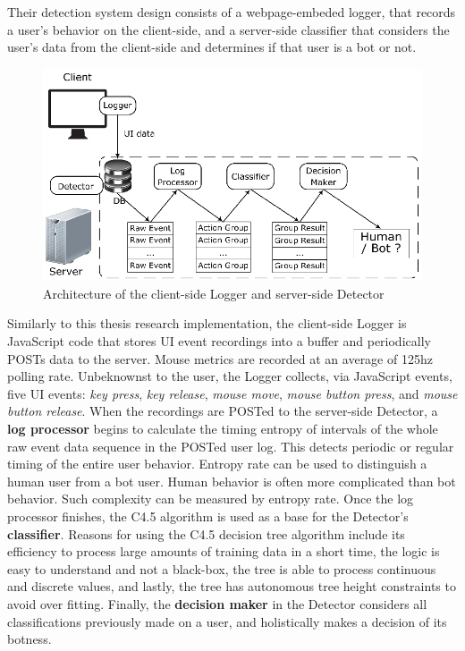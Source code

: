Their detection system design consists of a webpage-embeded logger, that records a user's behavior on the client-side, and a server-side classifier that considers the user's data from the client-side and determines if that user is a bot or not.
\begin{figure}[!h]
    \centering
    \includegraphics[width=.8\columnwidth]{figures/bot_or_human_system_architecture}
    \caption{Architecture of the client-side Logger and server-side Detector}
    \label{fig:bot-or-human-architecture}
\end{figure}
Similarly to this thesis research implementation, the client-side Logger is JavaScript code that stores UI event recordings into a buffer and periodically POSTs data to the server.
Mouse metrics are recorded at an average of 125hz polling rate.
Unbeknownst to the user, the Logger collects, via JavaScript events, five UI events: \textit{key press}, \textit{key release}, \textit{mouse move}, \textit{mouse button press}, and \textit{mouse button release}.
When the recordings are POSTed to the server-side Detector, a \textbf{log processor} begins to calculate the timing entropy of intervals of the whole raw event data sequence in the POSTed user log.
This detects periodic or regular timing of the entire user behavior.
Entropy rate can be used to distinguish a human user from a bot user.
Human behavior is often more complicated than bot behavior.
Such complexity can be measured by entropy rate.
Once the log processor finishes, the C4.5 algorithm is used as a base for the Detector's \textbf{classifier}.
Reasons for using the C4.5 decision tree algorithm include its efficiency to process large amounts of training data in a short time, the logic is easy to understand and not a black-box, the tree is able to process continuous and discrete values, and lastly, the tree has autonomous tree height constraints to avoid over fitting.
Finally, the \textbf{decision maker} in the Detector considers all classifications previously made on a user, and holistically makes a decision of its botness.
